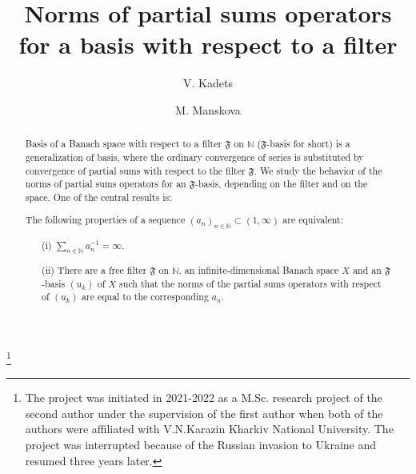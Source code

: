 \documentclass[11pt,twoside, reqno]{amsart}
\newcommand{\N}{{\mathbb N}}
\newcommand{\F}{\mathfrak{F}}
\theoremstyle{plain}
\theoremstyle{remark}
\theoremstyle{definition}
\numberwithin{equation}{section}
\begin{document}
\title[Norms of partial sums for an $\F$-basis]{Norms of partial sums operators for a basis with respect to a filter}
\author[Kadets]{V. Kadets}

\address[Kadets]{ \href{http://orcid.org/0000-0002-5606-2679}{ORCID: \texttt{0000-0002-5606-2679}} {School of Mathematical Sciences, Holon Institute of Technology (Israel)}}

\author[Manskova]{M. Manskova}

\address[Manskova]{ \href{http://orcid.org/0009-0005-4012-4790}{ORCID: \texttt{0009-0005-4012-4790}} {Graz University of Technology (Austria)
}}


\begin{abstract}
Basis of a Banach space with respect to a filter $\F$ on $\N$ ($\F$-basis for short)  is a generalization of basis, where the ordinary convergence of series is substituted by convergence of partial sums with respect to the filter $\F$. We study the behavior of the norms of partial sums operators for an $\F$-basis, depending on the filter and on the space. One of the central results is:

  The following properties of a sequence $(a_n)_{n \in \N} \subset (1, \infty)$ are equivalent:
\begin{enumerate}
\item[(i)] $\sum_{n \in \N} a_n^{-1} = \infty$.

\item[(ii)] There are a free filter $\F$ on $\N$, an infinite-dimensional Banach space $X$ and an $\F$-basis  $(u_k)$ of $X$ such that the norms of the partial sums operators with respect of $(u_k)$ are equal to the corresponding $a_n$.
\end{enumerate}

\end{abstract}


\thanks{The project was initiated in 2021-2022 as a M.Sc. research project of the second author under the supervision of the first author when both of the authors were affiliated with V.N.Karazin Kharkiv National University. The project was interrupted because of the Russian invasion to Ukraine and resumed three years later.}

\maketitle
\end{document}
